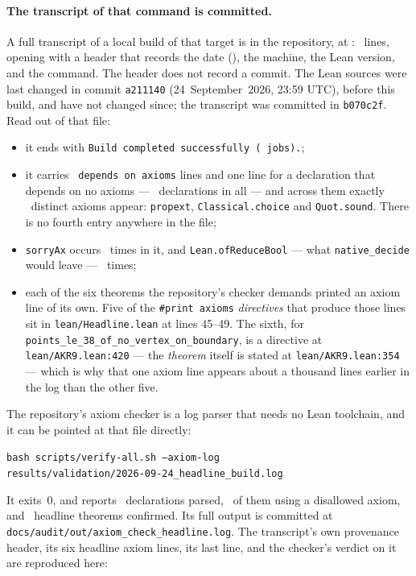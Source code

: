 \documentclass[11pt]{article}
\newcommand{\code}[1]{\texttt{\small #1}}
\newenvironment{trustbox}%
  {\par\medskip\setlength{\fboxsep}{9pt}%
   \begin{lrbox}{\trustboxbuf}%
   \begin{minipage}{\dimexpr\textwidth-2\fboxsep-2\fboxrule\relax}}%
  {\end{minipage}\end{lrbox}%
   \noindent\fcolorbox{black!35}{black!4}{\usebox{\trustboxbuf}}\par\medskip}
\begin{document}
\paragraph{The transcript of that command is committed.}
A full transcript of a local build of that target is in the repository, at
\hllogpath: \hllines\ lines, opening with a header that records the date
(\hllogdate), the machine, the Lean version, and the command. The header does
not record a commit. The Lean sources were last changed in commit
\code{a211140} (24~September~2026, 23:59 UTC), before this build, and have
not changed since; the transcript was committed in \code{b070c2f}.
Read out of that file:

\begin{itemize}
\item it ends with \code{Build completed successfully (\hljobs\ jobs).};
\item it carries \hldepends\ \code{depends on axioms} lines and one line for a
  declaration that depends on no axioms --- \hlparsed\ declarations in all ---
  and across them exactly \hlnaxioms\ distinct axioms appear: \code{propext},
  \code{Classical.choice} and \code{Quot.sound}. There is no fourth entry
  anywhere in the file;
\item \code{sorryAx} occurs \hlsorry\ times in it, and
  \code{Lean.ofReduceBool} --- what \code{native\_decide} would leave ---
  \hlnative\ times;
\item each of the six theorems the repository's checker demands printed an
  axiom line of its own. Five of the \code{\#print axioms} \emph{directives}
  that produce those lines sit in \code{lean/Headline.lean} at lines 45--49.
  The sixth, for \code{points\_le\_38\_of\_no\_vertex\_on\_boundary}, is a
  directive at \code{lean/AKR9.lean:420} --- the \emph{theorem} itself is
  stated at \code{lean/AKR9.lean:354} --- which is why that one axiom line
  appears about a thousand lines earlier in the log than the other five.
\end{itemize}

\noindent The repository's axiom checker
is a log parser that needs no Lean toolchain, and it can be pointed at that
file directly:

\begin{trustbox}
\centering\code{bash scripts/verify-all.sh --axiom-log}\\
\code{results/validation/2026-09-24\_headline\_build.log}
\end{trustbox}

\noindent It exits~0, and reports \hlparsed\ declarations parsed,
\hlbadaxioms\ of them using a disallowed axiom, and \hlheadlines\ headline
theorems confirmed. Its full output is committed at
\code{docs/audit/out/axiom\_check\_headline.log}. The transcript's own
provenance header, its six headline axiom lines, its last line, and the
checker's verdict on it are reproduced here:
\end{document}
